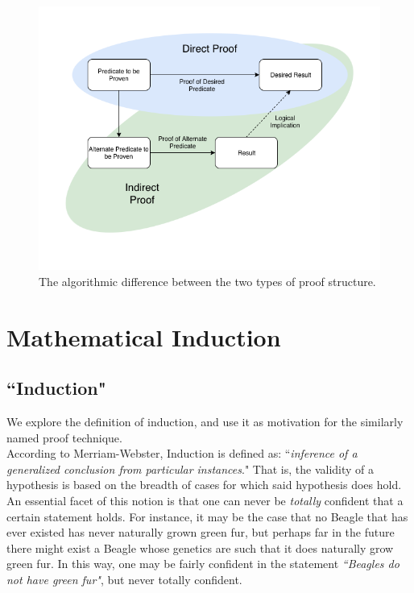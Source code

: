 \documentclass[10pt,a4paper,fleqn]{book}
\begin{document}
	\begin{figure}[h]
	\centering
	\includegraphics[scale=0.45]{res/direct_indirect.png}
	\caption{The algorithmic difference between the two types of proof structure.}
	\end{figure}

	\chapter{Mathematical Induction}


	\section{``Induction"}
	We explore the definition of induction, and use it as motivation for the similarly named proof technique. \\

	According to Merriam-Webster, Induction is defined as: ``\emph{inference of a generalized conclusion from particular instances}." That is, the validity of a hypothesis is based on the breadth of cases for which said hypothesis does hold.\\

	An essential facet of this notion is that one can never be \emph{totally} confident that a certain statement holds. For instance, it may be the case that no Beagle that has ever existed has never naturally grown green fur, but perhaps far in the future there might exist a Beagle whose genetics are such that it does naturally grow green fur. In this way, one may be fairly confident in the statement \emph{``Beagles do not have green fur"}, but never totally confident. \\
\end{document}
